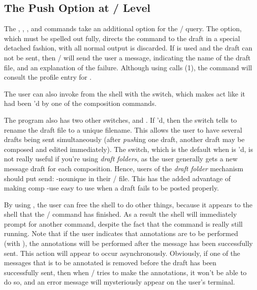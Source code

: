 \subsection{The Push Option at\/{ }\whatnow/ Level}
The , , , and  commands take
an additional option for the \whatnow/ query.
The  option, which must be spelled out fully,
directs the command to  the draft
in a special detached fashion,
with all normal output is discarded.
If  is used and the draft can not be sent,
then \MH/ will send the user a message,
indicating the name of the draft file,
and an explanation of the failure.
Although using  calls (1),
the  command will consult the profile entry for .
\par
The user can also invoke  from the shell with the 
switch,
which makes  act like it had been 'd by one of the
composition commands.%
\par
The  program also has two other switches,
 and .
If 'd,
then the  switch tells  to rename the draft file to
a unique filename.
This allows the user to have several drafts being sent simultaneously
(after {\it push\/}ing one draft,
another draft may be composed and edited immediately).
The  switch,
which is the default when  is 'd,
is not really useful if you're using {\it draft folders},
as the user generally gets a new message draft for each composition.
Hence, users of the {\it draft folder} mechanism should put
\example send: -nounique\endexample
in their \profile/ file.
This has the added advantage of making
\example comp -use\endexample
easy to use when a draft fails to be posted properly.
\par
By using , the user can free the shell to do other things,
because it appears to the shell that the \MH/ command has finished.
As a result the shell will immediately prompt for another command,
despite the fact that the command is really still running.
Note that if the user indicates that annotations are to be performed
(with ),
the annotations will be performed after the message has been
successfully sent.
This action will appear to occur asynchronously.
Obviously, if one of the messages that is to be annotated is
removed before the draft has been successfully sent,
then when \MH/ tries to make the annotations,
it won't be able to do so,
and an error message will mysteriously appear on the user's terminal.
